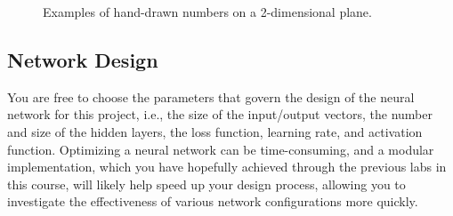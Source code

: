 \documentclass{article}
\begin{document}
\begin{figure}[h]
%
\qquad
{}%
\qquad
{}%
\qquad
{}%
\qquad
{}%

\caption{Examples of hand-drawn numbers on a 2-dimensional plane.}

\label{fig:pos}
\end{figure}

\subsection{Network Design}

You are free to choose the parameters that govern the design of the neural network for this project, i.e., the size of the input/output vectors, the number and size of the hidden layers, the loss function, learning rate, and activation function.
Optimizing a neural network can be time-consuming, and a modular implementation, which you have hopefully achieved through the previous labs in this course, will likely help speed up your design process, allowing you to investigate the effectiveness of various network configurations more quickly. 
\end{document}

